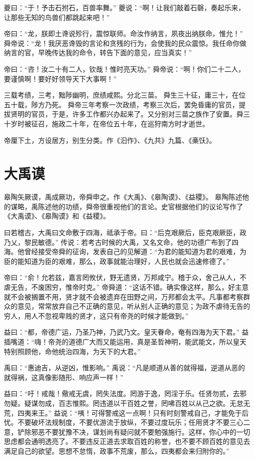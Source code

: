 \documentclass[a4paper,12pt,UTF8,twoside]{ctexbook}
\begin{document}
夔曰：“于！予击石拊石，百兽率舞。”
夔说：“啊！让我们敲着石磬，奏起乐来，让那些无知的鸟兽们都跳起来吧！”

帝曰：“龙，朕{即土}谗说殄行，震惊联师。命汝作纳言，夙夜出纳朕命，惟允！”
舜帝说：“龙！我厌恶谗毁的言论和贪残的行为，会使我的民众震惊。我任命你做纳言的官，早晚传达我的命令，转告下面的意见，应当真实！”

帝曰：“咨！汝二十有二人，钦哉！惟时亮天功。”
舜帝说：“啊！你们二十二人，要谨慎啊！要好好领导天下大事啊！”

三载考绩，三考，黜陟幽明，庶绩咸熙。分北三苗。 舜生三十征，庸三十，在位五十载，陟方乃死。
舜帝三年考察一次政绩，考察三次后，罢免昏庸的官员，提拔贤明的官员，于是，许多工作都兴办起来了。又分别对三苗之族作了安置。舜三十岁时被征召，施政二十年，在帝位五十年，在巡狩南方时才逝世。

帝厘下土，方设居方，别生分类。作《汩作》、《九共》九篇、《槀饫》。

\chapter{大禹谟}

皋陶矢厥谟，禹成厥功，帝舜申之。作《大禹》、《皋陶谟》、《益稷》。
皋陶陈述他的谋略，禹陈述他的功绩，舜帝很重视他们的言论。史官根据他们的议论写作了《大禹谟》、《皋陶谟》和《益稷》。

曰若稽古，大禹曰文命敷于四海，祗承于帝。曰：“后克艰厥后，臣克艰厥臣，政乃乂，黎民敏德。”
传说：若考古时候的大禹，又名文命，他的功德广布到了四海。他曾经接受帝舜的征询，发表自己的见解道：“为君的能知道为君的艰难，为臣的能知道为臣的艰难，那么，政事就能治理好，人民也就会迅速修德了。”

帝曰：“俞！允若兹，嘉言罔攸伏，野无遗贤，万邦咸宁。稽于众，舍己从人，不虐无告，不废困穷，惟帝时克。”
帝舜道：“这话不错。确实像这样，那么，好主意就不会被搁置不用，贤才就不会被遗弃在田野之间，万邦都会太平。凡事都考察群众的意见，常常放弃自己不正确的意见，听从别人正确的意见；为政不虐待无告的穷人，用人不忽视卑贱的贤才，这只有帝尧的时候才能做到。”

益曰：“都，帝德广运，乃圣乃神，乃武乃文。皇天眷命，奄有四海为天下君。”
益插嘴道：“嗨！帝尧的道德广大而又能运用，真是圣哲神明，能武能文，所以皇天特别照顾他，命他统治四海，为天下的大君。”

禹曰：“惠迪吉，从逆凶，惟影响。”
禹说：“凡是顺道从善的就得福，逆道从恶的就得祸，这真像影随形、响应声一样！”

益曰：“吁！戒哉！儆戒无虞，罔失法度。罔游于逸，罔淫于乐。任贤勿贰，去邪勿疑。疑谋勿成，百志惟熙。罔违道以干百姓之誉，罔咈百姓以从己之欲。无怠无荒，四夷来王。”
益说：“咦！可得警戒这一点啊！只有时刻警戒自己，才能免于后忧。不要破坏法规制度，不要优游流于放纵，不要过度玩乐；任用贤才不要三心二意，铲除邪恶不要犹豫不决，谋划尚有疑问就不要勉强施行。这样，你心中的一切思虑都会通明透亮了。不要违反正道去求取百姓的称誉，也不要不顾百姓的意见去满足自己的欲望。思想不怠惰，政事不荒废，那么，四夷都会来归附你的。”
\end{document}
